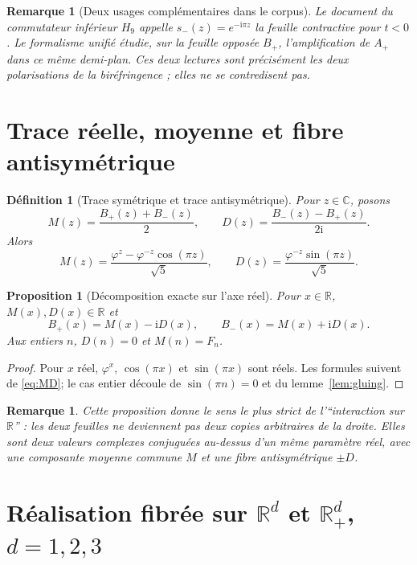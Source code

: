 \documentclass[11pt,a4paper]{article}
\newtheorem{proposition}[theorem]{Proposition}
\newtheorem{definition}[theorem]{Définition}
\newtheorem{remark}[theorem]{Remarque}
\newcommand{\R}{\mathbb R}
\newcommand{\C}{\mathbb C}
\newcommand{\Rp}{\mathbb R_{+}}
\newcommand{\ii}{\mathrm i}
\newcommand{\ph}{\varphi}
\begin{document}
\begin{remark}[Deux usages complémentaires dans le corpus]
Le document du commutateur inférieur $H_9$ appelle $s_-(z)=e^{-\ii\pi z}$ la feuille contractive pour $t<0$. Le formalisme unifié étudie, sur la feuille opposée $B_+$, l'amplification de $A_+$ dans ce même demi-plan. Ces deux lectures sont précisément les deux polarisations de la biréfringence ; elles ne se contredisent pas.
\end{remark}

\section{Trace réelle, moyenne et fibre antisymétrique}

\begin{definition}[Trace symétrique et trace antisymétrique]
Pour $z\in\C$, posons
\[
 M(z)=\frac{B_+(z)+B_-(z)}2,
 \qquad
 D(z)=\frac{B_-(z)-B_+(z)}{2\ii}.
\]
Alors
\begin{equation}\label{eq:MD}
 M(z)=\frac{\ph^z-\ph^{-z}\cos(\pi z)}{\sqrt5},
 \qquad
 D(z)=\frac{\ph^{-z}\sin(\pi z)}{\sqrt5}.
\end{equation}
\end{definition}

\begin{proposition}[Décomposition exacte sur l'axe réel]\label{prop:realaxis}
Pour $x\in\R$, $M(x),D(x)\in\R$ et
\[
 B_+(x)=M(x)-\ii D(x),\qquad
 B_-(x)=M(x)+\ii D(x).
\]
Aux entiers $n$, $D(n)=0$ et $M(n)=F_n$.
\end{proposition}

\begin{proof}
Pour $x$ réel, $\ph^x$, $\cos(\pi x)$ et $\sin(\pi x)$ sont réels. Les formules suivent de \eqref{eq:MD}; le cas entier découle de $\sin(\pi n)=0$ et du lemme~\ref{lem:gluing}.
\end{proof}

\begin{remark}
Cette proposition donne le sens le plus strict de l'``interaction sur $\R$'' : les deux feuilles ne deviennent pas deux copies arbitraires de la droite. Elles sont deux valeurs complexes conjuguées au-dessus d'un même paramètre réel, avec une composante moyenne commune $M$ et une fibre antisymétrique $\pm D$.
\end{remark}

\section{Réalisation fibrée sur $\R^d$ et $\Rp^d$, $d=1,2,3$}
\end{document}
